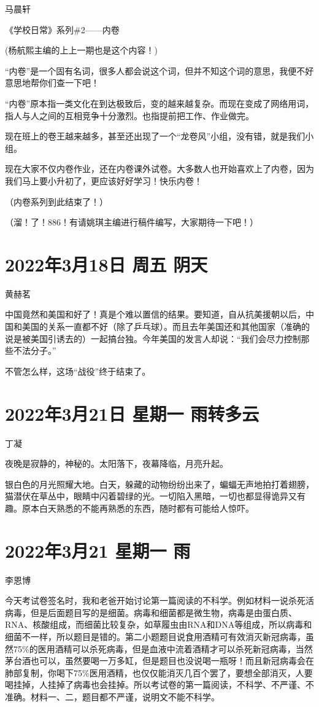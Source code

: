马晨轩

《学校日常》系列\#2——内卷

(杨航熙主编的上上一期也是这个内容！)

“内卷”是一个固有名词，很多人都会说这个词，但并不知这个词的意思，我便不好意思地帮你们查一下吧！

“内卷”原本指一类文化在到达极致后，变的越来越复杂。而现在变成了网络用词，指人与人之间的互相竞争十分激烈。也指提前把工作、作业做完。

现在班上的卷王越来越多，甚至还出现了一个“龙卷风”小组，没有错，就是我们小组。

现在大家不仅内卷作业，还在内卷课外试卷。大多数人也开始喜欢上了内卷，因为我们马上要小升初了，更应该好好学习！快乐内卷！

（内卷系列到此结束了！）

（溜！了！886！有请姚琪主编进行稿件编写，大家期待一下吧！）

\section{2022年3月18日 周五 阴天}

黄赫茗

中国竟然和美国和好了！真是个难以置信的结果。要知道，自从抗美援朝以后，中国和美国的关系一直都不好（除了乒乓球）。而且去年美国还和其他国家（准确的说是被美国引诱去的）一起搞台独。今年美国的发言人却说：“我们会尽力控制那些不法分子。”

不管怎么样，这场“战役”终于结束了。

\section{2022年3月21日 星期一 雨转多云}

丁凝

夜晚是寂静的，神秘的。太阳落下，夜幕降临，月亮升起。

银白色的月光照耀大地。白天，躲藏的动物纷纷出来了，蝙蝠无声地拍打着翅膀，猫潜伏在草丛中，眼睛中闪着碧绿的光。一切陷入黑暗，一切也都显得诡异又有趣。原本白天熟悉的不能再熟悉的东西，随时都有可能给人惊吓。

\section{2022年3月21 星期一 雨}

李恩博

今天考试卷签名时，我和老爸开始讨论第一篇阅读的不科学。例如材料一说杀死活病毒，但是后面题目写的是细菌。病毒和细菌都是微生物，病毒是由蛋白质、RNA、核酸组成，而细菌比较复杂，如草履虫由RNA和DNA等组成，所以病毒和细菌不一样，所以题目是错的。第二小题题目说食用酒精可有效消灭新冠病毒，虽然75\%的医用酒精可以杀死病毒，但是血液中流着酒精才可以杀死新冠病毒，当然茅台酒也可以，虽然要喝一万多缸，但是题目也没说喝一瓶呀！而且新冠病毒会在肺部复制，你喝下75\%医用酒精，也仅仅能消灭几百个罢了，要想全部消灭，人要喝挂掉，人挂掉了病毒也会挂掉。所以考试卷的第一篇阅读，不科学、不严谨、不准确。材料一、二，题目都不严谨，说明文不能不科学。

